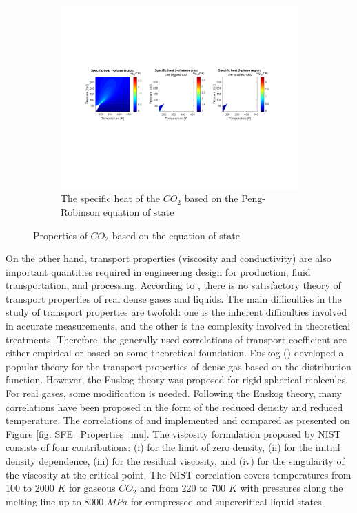 \documentclass[../Article_Model_Parameters.tex]{subfiles}
\begin{document}
\begin{figure}[H]
\begin{subfigure}[b]{0.95\textwidth}
                \label{fig: SFE_Properties_Density}
			\end{subfigure}
			\hfill
			\begin{subfigure}[b]{0.95\textwidth}
				\centering
				\includegraphics[trim = 2.9cm 7cm 3.cm 7cm,clip,width=\textwidth]{Figures/CP.pdf}	
				\caption{The specific heat of the $CO_2$ based on the Peng-Robinson equation of state}
                \label{fig: SFE_Properties_CP}
			\end{subfigure}
			\caption{Properties of $CO_2$ based on the equation of state}
			\label{fig: SFE_Properties}
		\end{figure}    

        On the other hand, transport properties (viscosity and conductivity) are also important quantities required in engineering design for production, fluid transportation, and processing. According to \citet{Sheng1989}, there is no satisfactory theory of transport properties of real dense gases and liquids. The main difficulties in the study of transport properties are twofold: one is the inherent difficulties involved in accurate measurements, and the other is the complexity involved in theoretical treatments. Therefore, the generally used correlations of transport coefficient are either empirical or based on some theoretical foundation. Enskog () developed a popular theory for the transport properties of dense gas based on the distribution function. However, the Enskog theory was proposed for rigid spherical molecules. For real gases, some modification is needed. Following the Enskog theory, many correlations have been proposed in the form of the reduced density and reduced temperature. The correlations of \citet{Fenghour1998} and \citet{Laesecke2017} implemented and compared as presented on Figure \ref{fig: SFE_Properties_mu}. The viscosity formulation proposed by NIST consists of four contributions: (i) for the limit of zero density, (ii) for the initial density dependence, (iii) for the residual viscosity, and (iv) for the singularity of the viscosity at the critical point. The NIST correlation covers temperatures from 100 to 2000 $K$ for gaseous $CO_2$ and from 220 to 700 $K$ with pressures along the melting line up to 8000 $MPa$ for compressed and supercritical liquid states. 
			
\end{document}
